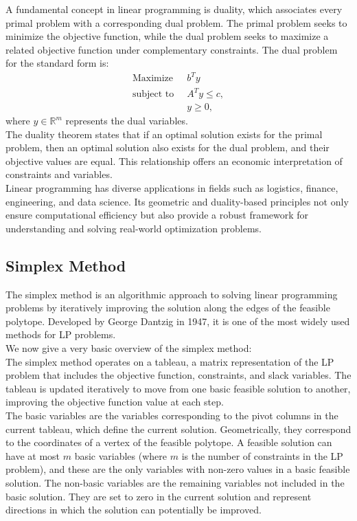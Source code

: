 \documentclass[10pt]{article}
\begin{document}
A fundamental concept in linear programming is duality, which associates every primal problem with a corresponding dual problem. The primal problem seeks to minimize the objective function, while the dual problem seeks to maximize a related objective function under complementary constraints. The dual problem for the standard form is:
\[
\begin{aligned}
\text{Maximize } & \ b^T y \\
\text{subject to } & \ A^T y \leq c, \\
& \ y \geq 0,
\end{aligned}
\]
where $y \in \mathbb{R}^m$ represents the dual variables.\\

The duality theorem states that if an optimal solution exists for the primal problem, then an optimal solution also exists for the dual problem, and their objective values are equal. This relationship offers an economic interpretation of constraints and variables.\\

Linear programming has diverse applications in fields such as logistics, finance, engineering, and data science. Its geometric and duality-based principles not only ensure computational efficiency but also provide a robust framework for understanding and solving real-world optimization problems.


\subsection{Simplex Method}

The simplex method is an algorithmic approach to solving linear programming problems by iteratively improving the solution along the edges of the feasible polytope. Developed by George Dantzig in 1947, it is one of the most widely used methods for LP problems.\\

We now give a very basic overview of the simplex method:\\

The simplex method operates on a tableau, a matrix representation of the LP problem that includes the objective function, constraints, and slack variables. The tableau is updated iteratively to move from one basic feasible solution to another, improving the objective function value at each step. \\

The basic variables are the variables corresponding to the pivot columns in the current tableau, which define the current solution. Geometrically, they correspond to the coordinates of a vertex of the feasible polytope. A feasible solution can have at most \( m \) basic variables (where \( m \) is the number of constraints in the LP problem), and these are the only variables with non-zero values in a basic feasible solution.
The non-basic variables are the remaining variables not included in the basic solution. They are set to zero in the current solution and represent directions in which the solution can potentially be improved.\\
\end{document}
